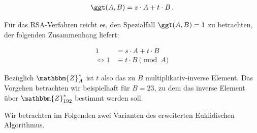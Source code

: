 \begin{align*}
	\ggt(A, B) = s \cdot A + t \cdot B\, .
\end{align*}

Für das RSA-Verfahren reicht es, den Spezialfall $\ggT(A,B) = 1$ zu betrachten, der folgenden Zusammenhang liefert:

\begin{align*}
	1 &= s \cdot A + t \cdot B\\
	\Leftrightarrow 1 &\equiv t \cdot B \pmod A
\end{align*}

Bezüglich $\mathbbm{Z}^*_{A}$ ist $t$ also das zu $B$
multiplikativ-inverse Element. Das Vorgehen betrachten wir beispielhaft
für $B = 23$, zu dem das inverse Element über $\mathbbm{Z}^{\ast}_{192}$
bestimmt werden soll.

Wir betrachten im Folgenden zwei Varianten des erweiterten Euklidischen
Algorithmus.

